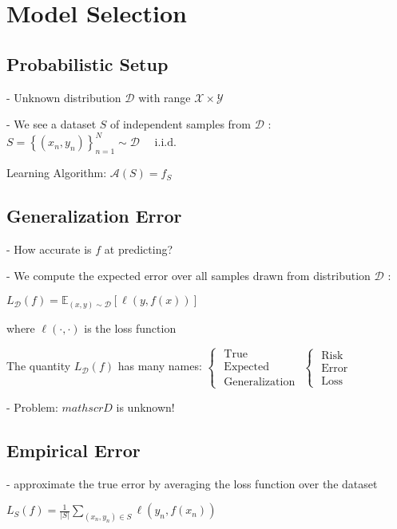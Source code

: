 \section*{Model Selection}

\subsection*{Probabilistic Setup}

- Unknown distribution $\mathscr{D}$ with range $\mathscr{X} \times \mathscr{Y}$

- We see a dataset $S$ of independent samples from $\mathscr{D}$ :
$
S=\left\{\left(x_{n}, y_{n}\right)\right\}_{n=1}^{N} \sim \mathscr{D} \quad \text { i.i.d. }
$

Learning Algorithm: $\mathscr{A}(S) = f_S$

\subsection*{Generalization Error}

- How accurate is $f$ at predicting?

- We compute the expected error over all samples drawn from distribution $\mathscr{D}$ :

$
L_{\mathscr{D}}(f)=\mathbb{E}_{(x, y) \sim \mathscr{D}}[\ell(y, f(x))]
$

where $\ell(\cdot, \cdot)$ is the loss function

The quantity $L_{\mathscr{D}}(f)$ has many names: $\left\{\begin{array}{l}\text { True } \\ \text { Expected } \\ \text { Generalization }\end{array}\left\{\begin{array}{l}\text { Risk } \\ \text { Error } \\ \text { Loss }\end{array}\right.\right.$


- Problem: $mathscr{D}$ is unknown!

\subsection*{Empirical Error}
- approximate the true error by averaging the loss function over the dataset

$
L_{S}(f)=\frac{1}{|S|} \sum_{\left(x_{n}, y_{n}\right) \in S} \ell\left(y_{n}, f\left(x_{n}\right)\right)
$

